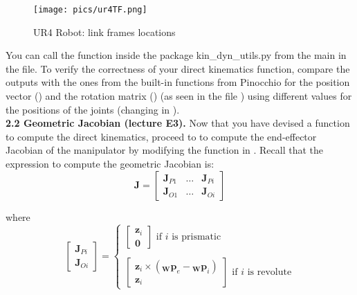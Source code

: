 \documentclass[11pt]{article}
\newcommand{\preposm}[3]{{}_{\mathbf{#2}}{\mathbf{#1}}_{#3}}
\begin{document}
\begin{figure}[bht]
	\centering
	\texttt{[image: pics/ur4TF.png]}
	\caption{UR4 Robot:  link frames locations}
	\label{fig:ur4_tf}
\end{figure} 


You can call the function inside the package kin\_dyn\_utils.py from the main in the  file. To verify the correctness of your direct kinematics function, compare the outputs with the ones from the built-in functions from Pinocchio for the position vector () and the rotation matrix () (as seen in the file ) using different values for the positions of the joints (changing  in ).\\





\textbf{2.2 Geometric Jacobian (lecture E3).} Now that you have devised a function to compute the direct kinematics, proceed to to compute the end-effector Jacobian of the manipulator by modifying the function  in . Recall that the expression to compute the geometric Jacobian is:
\begin{equation*}
	\mathbf{J} = \begin{bmatrix}
		\mathbf{J}_{P1} & \dots & \mathbf{J}_{Pi} \\
		\mathbf{J}_{O1} & \dots & \mathbf{J}_{Oi}
	\end{bmatrix}
\end{equation*}

where
\begin{equation*}
	\begin{bmatrix}
		\mathbf{J}_{Pi}\\
		\mathbf{J}_{Oi}
	\end{bmatrix} = 
	\begin{cases}
		\begin{bmatrix}
			\mathbf{z}_i \\
			\mathbf{0}
		\end{bmatrix} \text{   if $i$ is prismatic} \\
		\\
		\begin{bmatrix}
			\mathbf{z}_i \times (\preposm{p}{W}{e} - \preposm{p}{W}{i}) \\
			\mathbf{z}_i
		\end{bmatrix}\text{   if $i$ is revolute}
	\end{cases}
\end{equation*}
\end{document}
